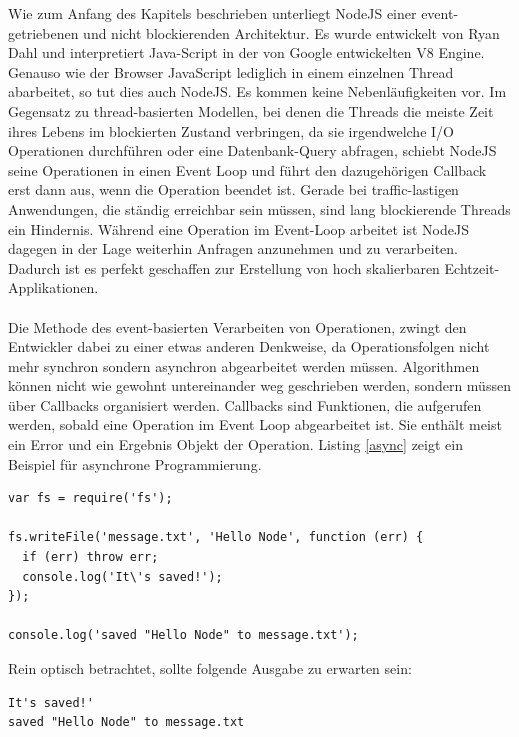 Wie zum Anfang des Kapitels beschrieben unterliegt NodeJS einer event-getriebenen und nicht blockierenden Architektur. Es wurde entwickelt von Ryan Dahl und interpretiert Java-Script in der von Google entwickelten V8 Engine. Genauso wie der Browser JavaScript lediglich in einem einzelnen Thread abarbeitet, so tut dies auch NodeJS. Es kommen keine Nebenläufigkeiten vor. Im Gegensatz zu thread-basierten Modellen, bei denen die Threads die meiste Zeit ihres Lebens im blockierten Zustand verbringen, da sie irgendwelche I/O Operationen durchführen oder eine Datenbank-Query abfragen, schiebt NodeJS seine Operationen in einen Event Loop und führt den dazugehörigen Callback erst dann aus, wenn die Operation beendet ist. Gerade bei traffic-lastigen Anwendungen, die ständig erreichbar sein müssen, sind lang blockierende Threads ein Hindernis. Während eine Operation im Event-Loop arbeitet ist NodeJS dagegen in der Lage weiterhin Anfragen anzunehmen und zu verarbeiten. Dadurch ist es perfekt geschaffen zur Erstellung von hoch skalierbaren Echtzeit-Applikationen.\\
\\
Die Methode des event-basierten Verarbeiten von Operationen, zwingt den Entwickler dabei zu einer etwas anderen Denkweise, da Operationsfolgen nicht mehr synchron sondern asynchron abgearbeitet werden müssen. Algorithmen können nicht wie gewohnt untereinander weg geschrieben werden, sondern müssen über Callbacks organisiert werden. Callbacks sind Funktionen, die aufgerufen werden, sobald eine Operation im Event Loop abgearbeitet ist. Sie enthält meist ein Error und ein Ergebnis Objekt der Operation. Listing \ref{async} zeigt ein Beispiel für asynchrone Programmierung.

\vspace{0.6cm}
\begin{lstlisting}[caption=Speichern eines Strings in eine Datei in NodeJS,label=async]
var fs = require('fs');

fs.writeFile('message.txt', 'Hello Node', function (err) {
  if (err) throw err;
  console.log('It\'s saved!');
});

console.log('saved "Hello Node" to message.txt');
\end{lstlisting}

Rein optisch betrachtet, sollte folgende Ausgabe zu erwarten sein:

\begin{verbatim}
It's saved!'
saved "Hello Node" to message.txt
\end{verbatim}

